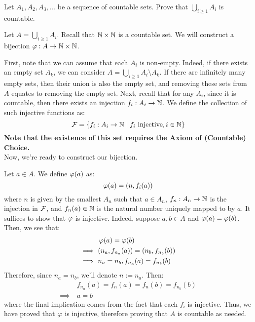 \documentclass{article}
\begin{document}
\setcounter{subsection}{1}

\begin{qu}
    Let $ A_{1}, A_{2}, A_{3}, \dots $ be a sequence of countable sets.
    Prove that $ \bigcup_{i \geq 1} A_{i} $ is countable.
\end{qu}

\begin{soln}[title=Using Axiom of (Countable) Choice]
    Let $ A = \bigcup_{i \geq 1} A_{i} $. 
    Recall that $ \mathbb{N} \times \mathbb{N} $ is a countable set.
    We will construct a bijection $ \operatorname{\varphi} : A \rightarrow \mathbb{N} \times \mathbb{N} $. \npgh

    First, note that we can assume that each $ A_{i} $ is non-empty. \vsp
    Indeed, if there exists an empty set $ A_{k} $, we can consider $ A = \bigcup_{i \geq 1} A_{i} \setminus A_{k} $.
    If there are infinitely many empty sets, then their union is also the empty set, and removing these sets from $ A $ equates to removing the empty set. \vsp
    Next, recall that for any $ A_{i} $, since it is countable, then there exists an injection $ f_{i} : A_{i} \rightarrow \mathbb{N} $.
    We define the collection of such injective functions as:
    \begin{equation*}
        \mathcal{F} = \left\{{f_{i} : A_{i} \rightarrow \mathbb{N} \mid f_{i} \textrm{ injective}, i \in \mathbb{N}}\right\}
    \end{equation*}
    \textbf{Note that the existence of this set requires the Axiom of (Countable) Choice.} \\
    Now, we're ready to construct our bijection. \npgh

    Let $ a \in A $. We define $ \operatorname{\varphi}(a) $ as:
    \begin{equation*}
        \operatorname{\varphi}(a) = (n, f_{i}(a))
    \end{equation*}
    where $ n $ is given by the smallest $ A_{n} $ such that $ a \in A_{n} $, 
    $ f_{n} : A_{n} \rightarrow \mathbb{N} $ is the injection in $ \mathcal{F} $, 
    and $ f_{n}(a) \in \mathbb{N} $ is the natural number uniquely mapped to by $ a $.
    It suffices to show that $ \operatorname{\varphi} $ is injective. \vsp
    Indeed, suppose $ a, b \in A $ and $ \operatorname{\varphi}(a) = \operatorname{\varphi}(b) $.
    Then, we see that:
    \begin{align*}
        & \operatorname{\varphi}(a) = \operatorname{\varphi}(b) \\
        \implies \ & (n_{a}, f_{n_{a}}(a)) = (n_{b}, f_{n_{b}}(b)) \\
        \implies \ & n_{a} = n_{b} , f_{n_{a}}(a) = f_{n_{b}}(b)
    \end{align*}
    Therefore, since $ n_{a} = n_{b} $, we'll denote $ n := n_{a} $. Then:
    \begin{align*}
        & f_{n_{a}}(a) = f_{n}(a) = f_{n}(b) = f_{n_{b}}(b) \\
        \implies \ & a = b
    \end{align*}
    where the final implication comes from the fact that each $ f_{i} $ is injective. \vsp
    Thus, we have proved that $ \operatorname{\varphi} $ is injective, therefore proving that $ A $ is countable as needed.
\end{soln}
\end{document}
